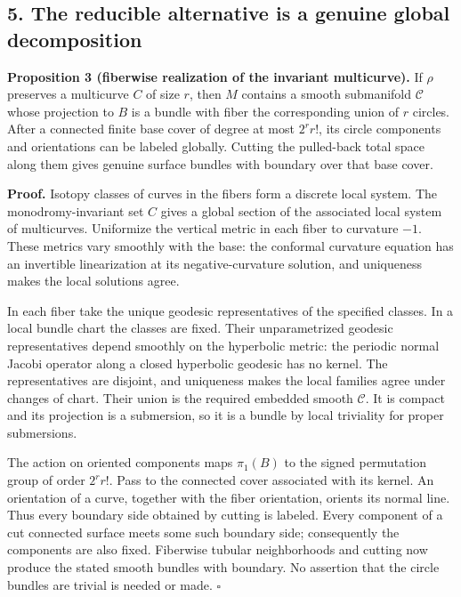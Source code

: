 \documentclass[
  11pt,
]{article}
\begin{document}
\hypertarget{the-reducible-alternative-is-a-genuine-global-decomposition}{%
\subsection{5. The reducible alternative is a genuine global
decomposition}\label{the-reducible-alternative-is-a-genuine-global-decomposition}}

\textbf{Proposition 3 (fiberwise realization of the invariant
multicurve).} If \(\rho\) preserves a multicurve \(C\) of size \(r\),
then \(M\) contains a smooth submanifold \(\mathcal C\) whose projection
to \(B\) is a bundle with fiber the corresponding union of \(r\)
circles. After a connected finite base cover of degree at most
\(2^r r!\), its circle components and orientations can be labeled
globally. Cutting the pulled-back total space along them gives genuine
surface bundles with boundary over that base cover.

\textbf{Proof.} Isotopy classes of curves in the fibers form a discrete
local system. The monodromy-invariant set \(C\) gives a global section
of the associated local system of multicurves. Uniformize the vertical
metric in each fiber to curvature \(-1\). These metrics vary smoothly
with the base: the conformal curvature equation has an invertible
linearization at its negative-curvature solution, and uniqueness makes
the local solutions agree.

In each fiber take the unique geodesic representatives of the specified
classes. In a local bundle chart the classes are fixed. Their
unparametrized geodesic representatives depend smoothly on the
hyperbolic metric: the periodic normal Jacobi operator along a closed
hyperbolic geodesic has no kernel. The representatives are disjoint, and
uniqueness makes the local families agree under changes of chart. Their
union is the required embedded smooth \(\mathcal C\). It is compact and
its projection is a submersion, so it is a bundle by local triviality
for proper submersions.

The action on oriented components maps \(\pi_1(B)\) to the signed
permutation group of order \(2^r r!\). Pass to the connected cover
associated with its kernel. An orientation of a curve, together with the
fiber orientation, orients its normal line. Thus every boundary side
obtained by cutting is labeled. Every component of a cut connected
surface meets some such boundary side; consequently the components are
also fixed. Fiberwise tubular neighborhoods and cutting now produce the
stated smooth bundles with boundary. No assertion that the circle
bundles are trivial is needed or made. \(\square\)
\end{document}
